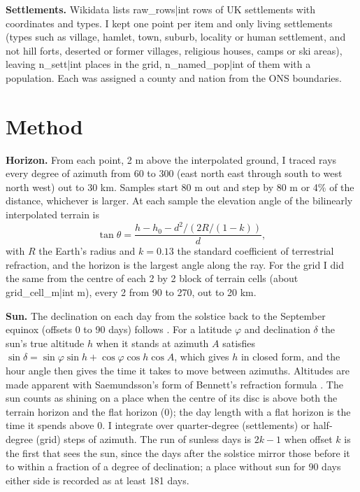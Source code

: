 \documentclass[11pt,a4paper]{article}
\begin{document}
\textbf{Settlements.} Wikidata \citep{wikidata} lists {{raw_rows|int}} rows of UK settlements with coordinates and types. I kept one point per item and only living settlements (types such as village, hamlet, town, suburb, locality or human settlement, and not hill forts, deserted or former villages, religious houses, camps or ski areas), leaving {{n_sett|int}} places in the grid, {{n_named_pop|int}} of them with a population. Each was assigned a county and nation from the ONS boundaries.

\section{Method}
\textbf{Horizon.} From each point, 2 m above the interpolated ground, I traced rays every degree of azimuth from 60\textdegree{} to 300\textdegree{} (east north east through south to west north west) out to 30 km. Samples start 80 m out and step by 80 m or 4\% of the distance, whichever is larger. At each sample the elevation angle of the bilinearly interpolated terrain is
\[ \tan\theta = \frac{h - h_0 - d^2 / (2R/(1-k))}{d}, \]
with $R$ the Earth's radius and $k = 0.13$ the standard coefficient of terrestrial refraction, and the horizon is the largest angle along the ray. For the grid I did the same from the centre of each 2 by 2 block of terrain cells (about {{grid_cell_m|int}} m), every 2\textdegree{} from 90\textdegree{} to 270\textdegree{}, out to 20 km.

\textbf{Sun.} The declination on each day from the solstice back to the September equinox (offsets 0 to 90 days) follows \citet{cooper1969}. For a latitude $\varphi$ and declination $\delta$ the sun's true altitude $h$ when it stands at azimuth $A$ satisfies $\sin\delta = \sin\varphi\sin h + \cos\varphi\cos h\cos A$, which gives $h$ in closed form, and the hour angle then gives the time it takes to move between azimuths. Altitudes are made apparent with Saemundsson's form of Bennett's refraction formula \citep{bennett1982,saemundsson1986}. The sun counts as shining on a place when the centre of its disc is above both the terrain horizon and the flat horizon (0\textdegree{}); the day length with a flat horizon is the time it spends above 0\textdegree{}. I integrate over quarter-degree (settlements) or half-degree (grid) steps of azimuth. The run of sunless days is $2k-1$ when offset $k$ is the first that sees the sun, since the days after the solstice mirror those before it to within a fraction of a degree of declination; a place without sun for 90 days either side is recorded as at least 181 days.
\end{document}
